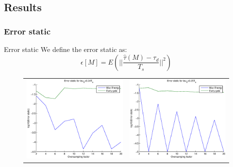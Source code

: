 \documentclass{beamer}
\begin{document}
\subsection{Results}
	\subsubsection{Error static}
		\begin{frame}{Error static}
			We define the error static as:
			\begin{equation}
			\epsilon[M] = E (||\frac{\hat{\tau}(M)-\tau_d}{T_s}||^2)
			\end{equation}
		\begin{figure}[h!]
			\centering
			\begin{tabular}{cc}
			\includegraphics[width = 0.47 \textwidth]{err1.eps} &\includegraphics[width= 0.47 \textwidth]{err2.eps}
			\end{tabular}
		\end{figure}
		\end{frame}
\end{document}
